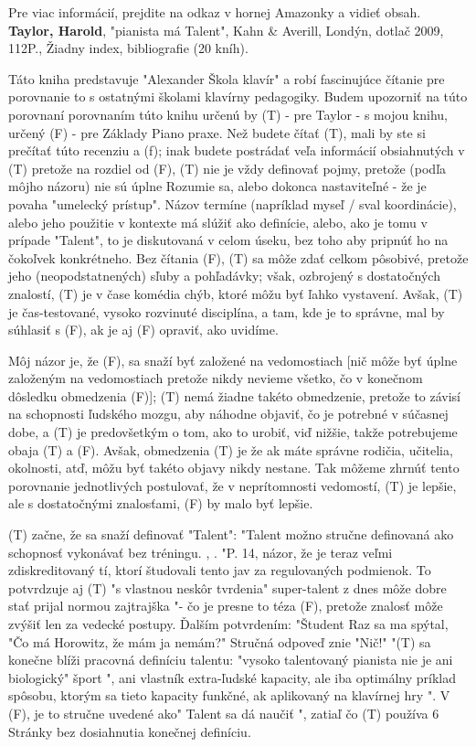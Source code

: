 \documentclass[11pt,a4paper%
]{article}
\begin{document}
Pre viac informácií, prejdite na odkaz v hornej Amazonky a vidieť obsah.
\medskip\\
\textbf{Taylor, Harold}, "pianista má Talent", Kahn \& Averill, Londýn, dotlač 2009, 112P., Žiadny index, bibliografie (20 kníh).

Táto kniha predstavuje "Alexander Škola klavír" a robí fascinujúce čítanie pre porovnanie to s ostatnými školami klavírny pedagogiky. Budem upozorniť na túto porovnaní porovnaním túto knihu určenú by (T) - pre Taylor - s mojou knihu, určený (F) - pre Základy Piano praxe. Než budete čítať (T), mali by ste si prečítať túto recenziu a (f); inak budete postrádať veľa informácií obsiahnutých v (T) pretože na rozdiel od (F), (T) nie je vždy definovať pojmy, pretože (podľa môjho názoru) nie sú úplne Rozumie sa, alebo dokonca nastaviteľné - že je povaha "umelecký prístup". Názov termíne (napríklad myseľ / sval koordinácie), alebo jeho použitie v kontexte má slúžiť ako definície, alebo, ako je tomu v prípade "Talent", to je diskutovaná v celom úseku, bez toho aby pripnúť ho na čokoľvek konkrétneho. Bez čítania (F), (T) sa môže zdať celkom pôsobivé, pretože jeho (neopodstatnených) sľuby a pohľadávky; však, ozbrojený s dostatočných znalostí, (T) je v čase komédia chýb, ktoré môžu byť ľahko vystavení. Avšak, (T) je čas-testované, vysoko rozvinuté disciplína, a tam, kde je to správne, mal by súhlasiť s (F), ak je aj (F) opraviť, ako uvidíme.

Môj názor je, že (F), sa snaží byť založené na vedomostiach [nič môže byť úplne založeným na vedomostiach pretože nikdy nevieme všetko, čo v konečnom dôsledku obmedzenia (F)]; (T) nemá žiadne takéto obmedzenie, pretože to závisí na schopnosti ľudského mozgu, aby náhodne objaviť, čo je potrebné v súčasnej dobe, a (T) je predovšetkým o tom, ako to urobiť, viď nižšie, takže potrebujeme obaja (T) a (F). Avšak, obmedzenia (T) je že ak máte správne rodičia, učitelia, okolnosti, atď, môžu byť takéto objavy nikdy nestane. Tak môžeme zhrnúť tento porovnanie jednotlivých postulovať, že v neprítomnosti vedomostí, (T) je lepšie, ale s dostatočnými znalosťami, (F) by malo byť lepšie.

(T) začne, že sa snaží definovať "Talent": "Talent možno stručne definovaná ako schopnosť vykonávať bez tréningu. , . "P. 14, názor, že je teraz veľmi zdiskreditovaný tí, ktorí študovali tento jav za regulovaných podmienok. To potvrdzuje aj (T) "s vlastnou neskôr tvrdenia" super-talent z dnes môže dobre stať prijal normou zajtrajška "- čo je presne to téza (F), pretože znalosť môže zvýšiť len za vedecké postupy. Ďalším potvrdením: "Študent Raz sa ma spýtal, "Čo má Horowitz, že mám ja nemám?" Stručná odpoveď znie "Nič!" "(T) sa konečne blíži pracovná definíciu talentu: "vysoko talentovaný pianista nie je ani biologický" šport ", ani vlastník extra-ľudské kapacity, ale iba optimálny príklad spôsobu, ktorým sa tieto kapacity funkčné, ak aplikovaný na klavírnej hry ". V (F), je to stručne uvedené ako" Talent sa dá naučiť ", zatiaľ čo (T) používa 6 Stránky bez dosiahnutia konečnej definíciu.
\end{document}
